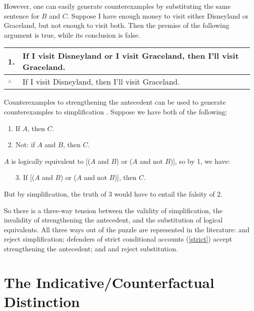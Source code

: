 However, one can easily generate counterexamples by substituting the same sentence for $B$ and $C$.  Suppose I have enough money to visit either Disneyland or Graceland, but not enough to visit both.  Then the premise of the following argument is true, while its conclusion is false.\smallskip\\
\begin{tabular}{ll}
1. & If I visit Disneyland or I visit Graceland, then I'll visit Graceland.\\
\hline
$\therefore$ & If I visit Disneyland, then I'll visit Graceland.
\end{tabular}

\medskip

Counterexamples to strengthening the antecedent can be used to generate counterexamples to simplification \citep{Fine1975-FINCN-2}.  Suppose we have both of the following:
\begin{enumerate}
\item If $A$, then $C$.
\item Not: if $A$ and $B$, then $C$.
\end{enumerate}
$A$ is logically equivalent to [($A$ and $B$) or ($A$ and not $B$)], so by 1, we have:
\begin{enumerate}
\item[3.] If [($A$ and $B$) or ($A$ and not $B$)], then $C$.
\end{enumerate}
But by simplification, the truth of 3 would have to entail the falsity of 2.

So there is a three-way tension between the validity of simplification, the invalidity of strengthening the antecedent, and the substitution of logical equivalents. All three ways out of the puzzle are represented in the literature: \citet{Loewer1976-LOECWD} and \citet{Mckay1977-MCKCWD} reject simplification; defenders of strict conditional accounts (\autoref{strict}) accept strengthening the antecedent; and \citet{Nute1975-NUTCAT-2} and \citet{Alonso-Ovalle2009-ALOCCA} reject substitution.

\section{The Indicative/Counterfactual Distinction}
\label{indicative-counterfactual}

